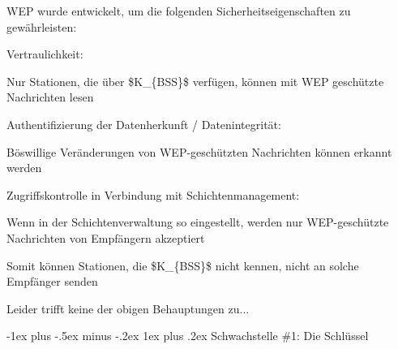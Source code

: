 \documentclass[a4paper]{article}
\makeatletter
\renewcommand{\subsubsection}{\@startsection{subsubsection}{3}{0mm}%
 {-1ex plus -.5ex minus -.2ex}%
 {1ex plus .2ex}%
 {\normalfont\small\bfseries}}
\makeatother
\begin{document}
\begin{multicols}{3}
      \begin{itemize*}
            \item WEP wurde entwickelt, um die folgenden Sicherheitseigenschaften zu
            gewährleisten:
            \begin{itemize*}
                  \item Vertraulichkeit:
                  \begin{itemize*} \item Nur Stationen, die über \$K\_\{BSS\}\$ verfügen, können mit WEP geschützte Nachrichten lesen \end{itemize*}
                  \item Authentifizierung der Datenherkunft / Datenintegrität:
                  \begin{itemize*} \item Böswillige Veränderungen von WEP-geschützten Nachrichten können erkannt werden \end{itemize*}
                  \item Zugriffskontrolle in Verbindung mit Schichtenmanagement:
                  \begin{itemize*} \item Wenn in der Schichtenverwaltung so eingestellt, werden nur WEP-geschützte Nachrichten von Empfängern akzeptiert \item Somit können Stationen, die \$K\_\{BSS\}\$ nicht kennen, nicht an solche Empfänger senden \end{itemize*}
            \end{itemize*}
            \item Leider trifft keine der obigen Behauptungen zu...
      \end{itemize*}


      \subsubsection{Schwachstelle \#1: Die
            Schlüssel}


\end{multicols}
\end{document}
